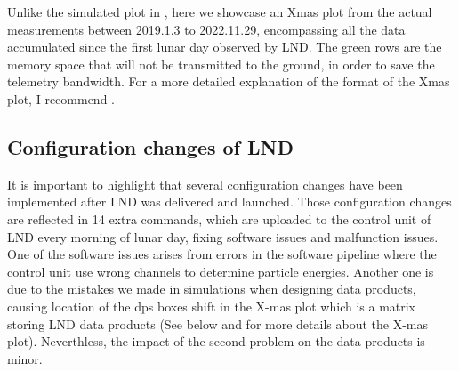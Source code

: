 Unlike the simulated plot in \citep{Wimmer2020SSRv}, here we showcase an Xmas plot from the actual measurements between 2019.1.3 to 2022.11.29, encompassing all the data accumulated since the first lunar day observed by \ac{LND}. The green rows are the memory space that will not be transmitted to the ground, in order to save the telemetry bandwidth. 
For a more detailed explanation of the format of the Xmas plot, I recommend \citep{Wimmer2020SSRv}.


\subsection{Configuration changes of LND}

It is important to highlight that several configuration changes have been implemented after \ac{LND} was delivered and launched. Those configuration changes are reflected in 14 extra commands, which are uploaded to the control unit of \ac{LND} every morning of lunar day, fixing software issues and malfunction issues. One of the software issues arises from errors in the software pipeline where the control unit use wrong channels to determine particle energies. Another one is due to the mistakes we made in simulations when designing data products, causing location of the \ac{dps} boxes shift in the X-mas plot which is a matrix storing \ac{LND} data products (See below and \citet{Wimmer-2020-LND} for more details about the X-mas plot). Neverthless, the impact of the second problem on the data products is minor. 

